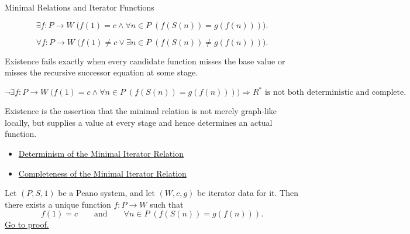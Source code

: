 \begin{topicbox}{Minimal Relations and Iterator Functions}
\begin{remark*}
\[
\exists f:P\to W\;
\bigl(f(1)=c\land \forall n\in P\;(f(S(n))=g(f(n)))\bigr).
\]
\end{remark*}


\begin{remark*}
\[
\forall f:P\to W\;
\bigl(f(1)\neq c\lor \exists n\in P\;(f(S(n))\neq g(f(n)))\bigr).
\]
\end{remark*}

\begin{remark*}
Existence fails exactly when every candidate function misses the base value or
misses the recursive successor equation at some stage.
\end{remark*}

\begin{remark*}
\[
\neg\exists f:P\to W\;
\bigl(f(1)=c\land \forall n\in P\;(f(S(n))=g(f(n)))\bigr)
\Longrightarrow
R^* \text{ is not both deterministic and complete}.
\]
\end{remark*}

\begin{remark*}[Interpretation]
Existence is the assertion that the minimal relation is not merely graph-like
locally, but supplies a value at every stage and hence determines an actual
function.
\end{remark*}

\begin{remark*}[Dependencies]
\begin{itemize}
  \item \hyperref[lem:minimal-iterator-relation-deterministic]{Determinism of the Minimal Iterator Relation}
  \item \hyperref[lem:minimal-iterator-relation-complete]{Completeness of the Minimal Iterator Relation}
\end{itemize}
\end{remark*}

\begin{tcolorbox}[colback=thmbox, colframe=thmborder, arc=2pt,
  left=6pt, right=6pt, top=4pt, bottom=4pt,
  title={\small\textbf{Theorem (Peano Iterator Theorem)}},
  fonttitle=\small\bfseries]
\begin{theorem}
\label{thm:peano-iterator-theorem}
Let $(P,S,1)$ be a Peano system, and let $(W,c,g)$ be iterator data for it.
Then there exists a unique function $f:P\to W$ such that
\[
f(1)=c
\qquad\text{and}\qquad
\forall n\in P\;(f(S(n))=g(f(n))).
\]
\hyperref[prf:peano-iterator-theorem]{Go to proof.}
\end{theorem}
\end{tcolorbox}


\end{topicbox}
